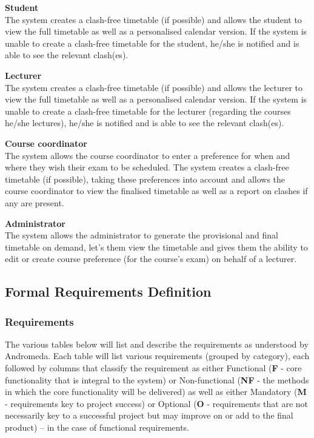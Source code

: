 \documentclass{article}
\begin{document}
\textbf{Student} \\
The system creates a clash-free timetable (if possible) and allows the student to view the full timetable as well as a personalised calendar version. If the system is unable to create a clash-free timetable for the student, he/she is notified and is able to see the relevant clash(es).

\textbf{Lecturer} \\
The system creates a clash-free timetable (if possible) and allows the lecturer to view the full timetable as well as a personalised calendar version. If the system is unable to create a clash-free timetable for the lecturer (regarding the courses he/she lectures), he/she is notified and is able to see the relevant clash(es).

\textbf{Course coordinator} \\
The system allows the course coordinator to enter a preference for when and where they wish their exam to be scheduled. The system creates a clash-free timetable (if possible), taking these preferences into account and allows the course coordinator to view the finalised timetable as well as a report on clashes if any are present.

\textbf{Administrator} \\
The system allows the administrator to generate the provisional and final timetable on demand, let's them view the timetable and gives them the ability to edit or create course preference (for the course's exam) on behalf of a lecturer.

\subsection{Formal Requirements Definition}

\subsubsection{Requirements}

The various tables below will list and describe the requirements as understood by Andromeda. Each table will list various requirements (grouped by category), each followed by columns that classify the requirement as either Functional (\textbf{F} - core functionality that is integral to the system) or Non-functional (\textbf{NF} - the methods in which the core functionality will be delivered) as well as either Mandatory (\textbf{M} - requirements key to project success) or Optional (\textbf{O} - requirements that are not necessarily key to a successful project but may improve on or add to the final product) – in the case of functional requirements.
\end{document}
